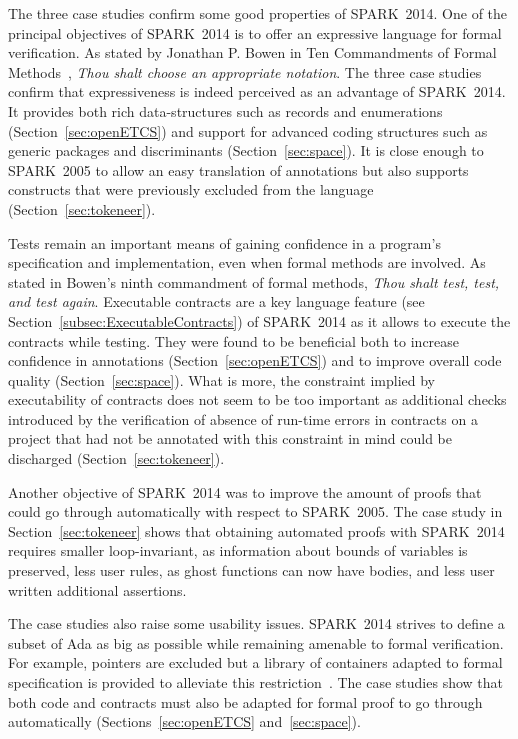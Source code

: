 \documentclass[10pt,a4paper,twocolumn]{article}
\newcommand{\oldspark}{SPARK~2005\xspace}
\newcommand{\newspark}{SPARK~2014\xspace}
\begin{document}
The three case studies confirm some good properties of \newspark.  One
of the principal objectives of \newspark is to offer an expressive
language for formal verification. As stated by Jonathan P. Bowen in
Ten Commandments of Formal Methods~\cite{bowen1995ten}, \emph{Thou
  shalt choose an appropriate notation}. The three case studies
confirm that expressiveness is indeed perceived as an advantage of
\newspark. It provides both rich data-structures such as records and
enumerations (Section~\ref{sec:openETCS}) and support for advanced
coding structures such as generic packages and discriminants
(Section~\ref{sec:space}). It is close enough to \oldspark to allow an
easy translation of annotations but also supports constructs that were
previously excluded from the language (Section~\ref{sec:tokeneer}).

Tests remain an important means of gaining confidence in a program's
specification and implementation, even when formal methods are
involved. As stated in Bowen's ninth commandment of formal methods,
\emph{Thou shalt test, test, and test again}. Executable contracts are
a key language feature (see Section~\ref{subsec:ExecutableContracts})
of \newspark as it allows to execute the contracts while testing. They
were found to be beneficial both to increase confidence in annotations
(Section~\ref{sec:openETCS}) and to improve overall code quality
(Section~\ref{sec:space}). What is more, the constraint implied by
executability of contracts does not seem to be too important as
additional checks introduced by the verification of absence of
run-time errors in contracts on a project that had not be annotated
with this constraint in mind could be discharged
(Section~\ref{sec:tokeneer}).

Another objective of \newspark was to improve the amount of proofs
that could go through automatically with respect to \oldspark. The
case study in Section~\ref{sec:tokeneer} shows that obtaining
automated proofs with \newspark requires smaller loop-invariant, as
information about bounds of variables is preserved, less user rules,
as ghost functions can now have bodies, and less user written
additional assertions.

The case studies also raise some usability issues. \newspark strives
to define a subset of Ada as big as possible while remaining amenable
to formal verification. For example, pointers are excluded but a
library of containers adapted to formal specification is provided to
alleviate this restriction~\cite{dross2011correct}. The case studies
show that both code and contracts must also be adapted for formal
proof to go through automatically (Sections~\ref{sec:openETCS}
and~\ref{sec:space}).
\end{document}
